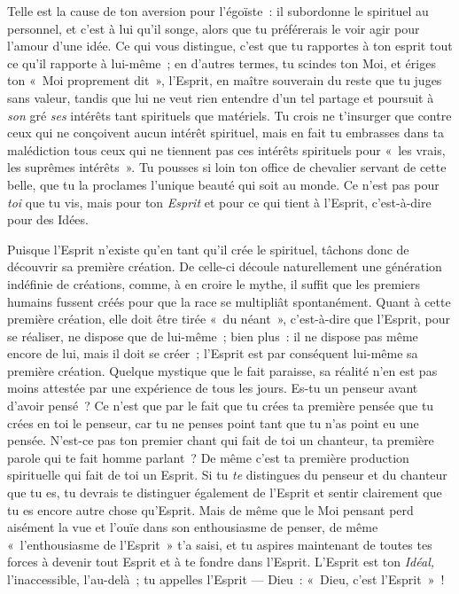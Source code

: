 \documentclass[french,twoside]{book} %
\begin{document}
Telle est la cause de ton aversion pour l’égoïste : il subordonne le spirituel au personnel, et c’est à lui qu’il songe, alors que tu préférerais le voir agir pour l’amour d’une idée. Ce qui vous distingue, c’est que tu rapportes à ton esprit tout ce qu’il rapporte à lui-même ; en d’autres termes, tu scindes ton Moi, et ériges ton « Moi proprement dit », l’Esprit, en maître souverain du reste que tu juges sans valeur, tandis que lui ne veut rien entendre d’un tel partage et poursuit à \emph{son} gré \emph{ses} intérêts tant spirituels que matériels. Tu crois ne t’insurger que contre ceux qui ne conçoivent aucun intérêt spirituel, mais en fait tu embrasses dans ta malédiction tous ceux qui ne tiennent pas ces intérêts spirituels pour « les vrais, les suprêmes intérêts ». Tu pousses si loin ton office de chevalier servant de cette belle, que tu la proclames l’unique beauté qui soit au monde. Ce n’est pas pour \emph{toi} que tu vis, mais pour ton \emph{Esprit} et pour ce qui tient à l’Esprit, c’est-à-dire pour des Idées.\par
Puisque l’Esprit n’existe qu’en tant qu’il crée le spirituel, tâchons donc de découvrir sa première création. De celle-ci découle naturellement une génération indéfinie de créations, comme, à en croire le mythe, il suffit que les premiers humains fussent créés pour que la race se multipliât spontanément. Quant à cette première création, elle doit être tirée « du néant », c’est-à-dire que l’Esprit, pour se réaliser, ne dispose que de lui-même ; bien plus : il ne dispose pas même encore de lui, mais il doit se créer ; l’Esprit est par conséquent lui-même sa première création. Quelque mystique que le fait paraisse, sa réalité n’en est pas moins attestée par une expérience de tous les jours. Es-tu un penseur avant d’avoir pensé ?  Ce n’est que par le fait que tu crées ta première pensée que tu crées en toi le penseur, car tu ne penses point tant que tu n’as point eu une pensée. N’est-ce pas ton premier chant qui fait de toi un chanteur, ta première parole qui te fait homme parlant ? De même c’est ta première production spirituelle qui fait de toi un Esprit. Si tu \emph{te} distingues du penseur et du chanteur que tu es, tu devrais te distinguer également de l’Esprit et sentir clairement que tu es encore autre chose qu’Esprit. Mais de même que le Moi pensant perd aisément la vue et l’ouïe dans son enthousiasme de penser, de même « l’enthousiasme de l’Esprit » t’a saisi, et tu aspires maintenant de toutes tes forces à devenir tout Esprit et à te fondre dans l’Esprit. L’Esprit est ton \emph{Idéal,} l’inaccessible, l’au-delà ; tu appelles l’Esprit — Dieu : « Dieu, c’est l’Esprit » !\par
\end{document}
